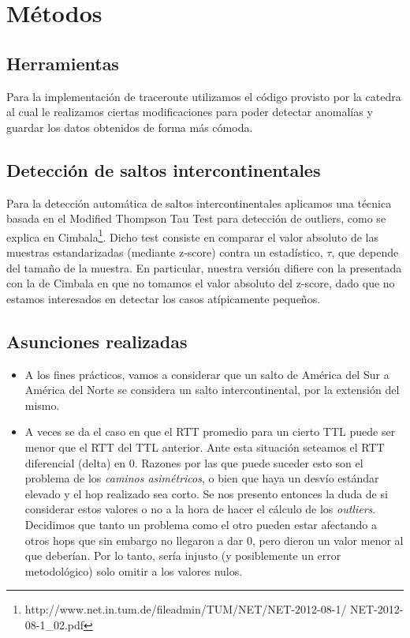 \section{Métodos}

\subsection*{Herramientas}
Para la implementación de traceroute utilizamos el código provisto por la catedra al cual le realizamos ciertas modificaciones para poder detectar anomalías y guardar los datos obtenidos de forma más cómoda.

\subsection*{Detección de saltos intercontinentales}

Para la detección automática de saltos intercontinentales aplicamos una técnica basada en el Modified Thompson Tau Test para detección de outliers, como se explica en Cimbala\footnote{http://www.net.in.tum.de/fileadmin/TUM/NET/NET-2012-08-1/
NET-2012-08-1\_02.pdf}. Dicho test consiste en comparar el valor absoluto de las muestras estandarizadas (mediante z-score) contra un estadístico, $\tau$, que depende del tamaño de la muestra. En particular, nuestra versión difiere con la presentada con la de Cimbala en que no tomamos el valor absoluto del z-score, dado que no estamos interesados en detectar los casos atípicamente pequeños. 

\subsection*{Asunciones realizadas}
\begin{itemize}
	\item A los fines prácticos, vamos a considerar que un salto de América del Sur a América del Norte se considera un salto intercontinental, por la extensión del mismo.
	\item A veces se da el caso en que el RTT promedio para un cierto TTL puede ser menor que el RTT del TTL anterior. Ante esta situación seteamos el RTT diferencial (delta) en 0. Razones por las que puede suceder esto son el problema de los \emph{caminos asimétricos}, o bien que haya un desvío estándar elevado y el hop realizado sea corto. Se nos presento entonces la duda de si considerar estos valores o no a la hora de hacer el cálculo de los \emph{outliers}. Decidimos que tanto un problema como el otro pueden estar afectando a otros hops que sin embargo no llegaron a dar 0, pero dieron un valor menor al que deberían. Por lo tanto, sería injusto (y posiblemente un error metodológico) solo omitir a los valores nulos.
\end{itemize}


